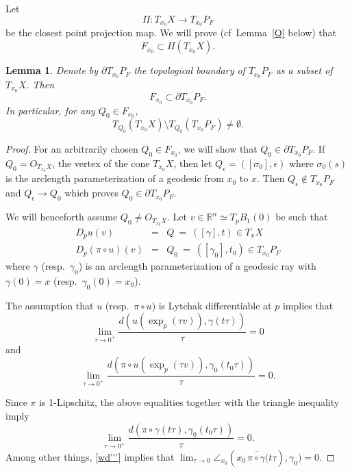 \documentclass[12pt]{amsart}
\newtheorem{lemma}[theorem]{Lemma}
\theoremstyle{definition}
\numberwithin{equation}{section}
\begin{document}
Let  $$\Pi:T_{x_0}X \to T_{x_0}P_F$$ be the closest point projection map.  
We will prove (cf~Lemma~\ref{Q} below) that
\[
F_{x_0}
\subset \Pi(T_{x_0}X).
\]


 
 
\begin{lemma} \label{boundarylemma}
Denote by  $\partial T_{x_0}P_F$  the topological boundary of $T_{x_0}P_F$ as a subset of  $T_{x_0} X$.  Then
 \[
F_{x_0}
\subset \partial T_{x_0}P_F.
 \]
In particular, 
for any $Q_0 \in F_{x_0}$, 
\[
T_{Q_0}(T_{x_0}X) \setminus T_{Q_0}(T_{x_0}P_F) \neq \emptyset.
\]
\end{lemma}


\begin{proof}
For an arbitrarily chosen  $Q_0 \in F_{x_0}$, we will show that $Q_0 \in \partial T_{x_0}P_F$.     If $Q_0=O_{T_{x_0}X}$, the vertex of the cone $T_{x_0}X$, then let $Q_\epsilon=([\sigma_0],\epsilon)$ where $\sigma_0(s)$ is the arclength parameterization of a geodesic from $x_0$ to $x$.  Then $Q_\epsilon \notin T_{x_0}P_F$ and $Q_\epsilon \to Q_0$ which proves $Q_0 \in \partial T_{x_0}P_F$.  

We will henceforth assume $Q_0 \neq O_{T_{x_0}X}$.
Let $v \in \mathbb R^n \simeq T_pB_1(0)$ be such that
\begin{eqnarray*}
D_pu(v) & = &  Q \ = \ ([\gamma],t) \in T_xX  \\ 
D_p(\pi \circ u)(v) & = &  Q_0 \ = \ ([\gamma_0],t_0) \in T_{x_0}P_F
\end{eqnarray*}
where $\gamma$ (resp.~$\gamma_0$) is an arclength parameterization of a  geodesic ray  with $\gamma(0)=x$ (resp.~$\gamma_0(0)=x_0$). 

The assumption that  $u$ (resp.~$\pi \circ u$) is Lytchak differentiable at $p$  implies that 
$$
\lim_{\tau \to 0^+} \frac{d(u(\exp_p(\tau v)), \gamma(t\tau))}{\tau} =0
$$
and 
$$
\lim_{\tau \to 0^+} \frac{d(\pi \circ u(\exp_p(\tau v)), \gamma_0(t_0\tau))}{\tau} =0.
$$

Since $\pi$ is 1-Lipschitz, the above equalities together with the triangle inequality imply
\begin{equation} \label{wd'''}
\lim_{\tau \to 0^+} \frac{d(\pi \circ \gamma(t\tau), \gamma_0(t_0\tau))}{\tau} =0.
\end{equation}
Among other things, \eqref{wd'''} implies that $\lim_{\tau \to 0} \angle_{x_0}(\overline{x_0\, \pi \circ \gamma(t \tau}), \gamma_0)=0$.




\end{proof}
\end{document}

